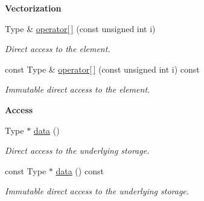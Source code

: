 \begin{Indent}{\bf Vectorization}\par
\begin{DoxyCompactItemize}
\item 
Type \& \hyperlink{classmagrathea_1_1AbstractNArray_a35ba1ecdedebc027a5361618782eeee5}{operator\mbox{[}$\,$\mbox{]}} (const unsigned int i)
\begin{DoxyCompactList}\small\item\em Direct access to the element. \end{DoxyCompactList}\item 
const Type \& \hyperlink{classmagrathea_1_1AbstractNArray_a1b76fbe570cae2a979abd2a6373ef336}{operator\mbox{[}$\,$\mbox{]}} (const unsigned int i) const 
\begin{DoxyCompactList}\small\item\em Immutable direct access to the element. \end{DoxyCompactList}\end{DoxyCompactItemize}
\end{Indent}
\begin{Indent}{\bf Access}\par
\begin{DoxyCompactItemize}
\item 
Type $\ast$ \hyperlink{classmagrathea_1_1AbstractNArray_a722c51fc3aa4622fd4d6913f93816158}{data} ()
\begin{DoxyCompactList}\small\item\em Direct access to the underlying storage. \end{DoxyCompactList}\item 
const Type $\ast$ \hyperlink{classmagrathea_1_1AbstractNArray_a7235dcbd62b86b5f1f4cedc1596728ee}{data} () const 
\begin{DoxyCompactList}\small\item\em Immutable direct access to the underlying storage. \end{DoxyCompactList}\end{DoxyCompactItemize}
\end{Indent}
